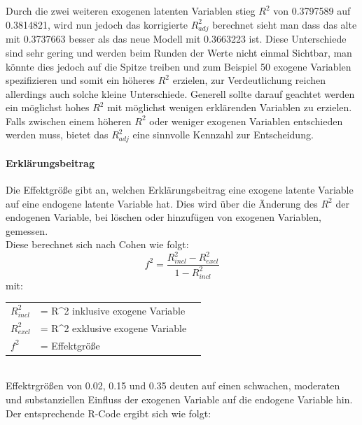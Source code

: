 \documentclass{article}\usepackage[]{graphicx}\usepackage[]{color}
\begin{document}
Durch die zwei weiteren exogenen latenten Variablen stieg $R^{2}$ von 0.3797589 auf 0.3814821, wird nun jedoch das korrigierte $R^{2}_{adj}$ berechnet sieht man dass das alte mit 0.3737663 besser als das neue Modell mit 0.3663223 ist. Diese Unterschiede sind sehr gering und werden beim Runden der Werte nicht einmal Sichtbar, man könnte dies jedoch auf die Spitze treiben und zum Beispiel 50 exogene Variablen spezifizieren und somit ein höheres $R^{2}$ erzielen, zur Verdeutlichung reichen allerdings auch solche kleine Unterschiede. Generell sollte darauf geachtet werden ein möglichst hohes $R^{2}$ mit möglichst wenigen erklärenden Variablen zu erzielen. Falls zwischen einem höheren $R^{2}$ oder weniger exogenen Variablen entschieden werden muss, bietet das $R^{2}_{adj}$ eine sinnvolle Kennzahl zur Entscheidung.

\paragraph{Erklärungsbeitrag}
Die Effektgröße gibt an, welchen Erklärungsbeitrag eine exogene latente Variable auf eine endogene latente Variable hat. Dies wird über die Änderung des $R^{2}$ der endogenen Variable, bei löschen oder hinzufügen von exogenen Variablen, gemessen.\\
Diese berechnet sich nach Cohen\cite{cohen1988statistical} wie folgt:
\begin{equation}
f^{2} = \frac{R^{2}_{incl}-R^{2}_{excl}}{1-R^{2}_{incl}}
\end{equation}
mit:\\
\begin{tabular}{lll}
$R^{2}_{incl}$ &= R^{2} inklusive exogene Variable\\
$R^{2}_{excl}$ &= R^{2} exklusive exogene Variable\\
$f^{2}$ &= Effektgröße
\end{tabular}
\\
Effektrgrößen von 0.02, 0.15 und 0.35 deuten auf einen schwachen, moderaten und substanziellen Einfluss der exogenen Variable auf die endogene Variable hin.\cite{cohen1988statistical,chin1998partial}\\
Der entsprechende R-Code ergibt sich wie folgt:
\end{document}
